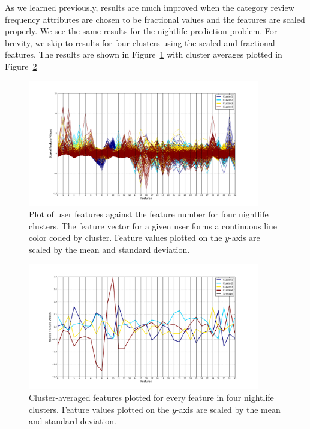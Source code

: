 \documentclass[11pt]{article}
\begin{document}
As we learned previously, results are much improved when the category review frequency attributes are chosen to be fractional values and the features are scaled properly. We see the same results for the nightlife prediction problem. For brevity, we skip to results for four clusters using the scaled and fractional features. The results are shown in Figure~\ref{fig:nl_kmeans_4} with cluster averages plotted in Figure~\ref{fig:nl_kmeans_4_avg}

\begin{figure}[h!]
	\centering
	\includegraphics[width=0.9\textwidth]{NL_kmeans4clusters_all.png}
	\caption{Plot of user features against the feature number for four nightlife clusters. The feature vector for a given user forms a continuous line color coded by cluster. Feature values plotted on the $y$-axis are scaled by the mean and standard deviation.}
	\label{fig:nl_kmeans_4}
\end{figure}

\begin{figure}[h!]
	\centering
	\includegraphics[width=0.9\textwidth]{NL_kmeans4clusters.png}
	\caption{Cluster-averaged features plotted for every feature in four nightlife clusters. Feature values plotted on the $y$-axis are scaled by the mean and standard deviation.}
	\label{fig:nl_kmeans_4_avg}
\end{figure}
\end{document}
